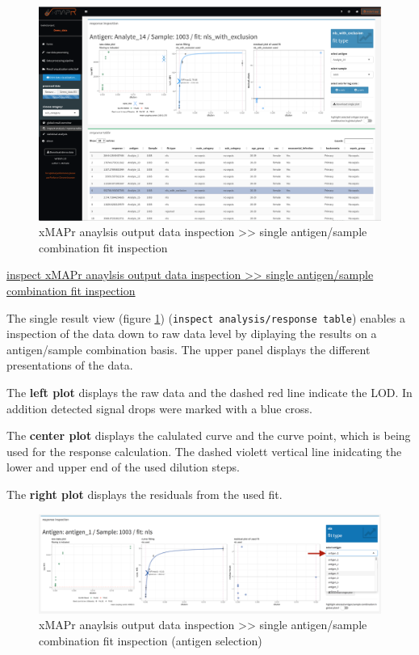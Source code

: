 \documentclass[]{book}
\theoremstyle{definition}
\theoremstyle{definition}
\theoremstyle{definition}
\theoremstyle{remark}
\begin{document}
\begin{figure}
\includegraphics[width=50.5in]{figures/inspect_single_results} \caption{xMAPr anaylsis output data inspection >> single antigen/sample combination fit inspection}\label{fig:SingleResults}
\end{figure}

\href{figures/inspect_single_results.png}{inspect xMAPr anaylsis output
data inspection \textgreater{}\textgreater{} single antigen/sample
combination fit inspection}

The single result view (figure \ref{fig:SingleResults})
(\texttt{inspect\ analysis/response\ table}) enables a inspection of the
data down to raw data level by diplaying the results on a antigen/sample
combination basis. The upper panel displays the different presentations
of the data.

The \textbf{left plot} displays the raw data and the dashed red line
indicate the LOD. In addition detected signal drops were marked with a
blue cross.

The \textbf{center plot} displays the calulated curve and the curve
point, which is being used for the response calculation. The dashed
violett vertical line inidcating the lower and upper end of the used
dilution steps.

The \textbf{right plot} displays the residuals from the used fit.

\begin{figure}
\includegraphics[width=54.53in]{figures/inspect_single_results1} \caption{xMAPr anaylsis output data inspection >> single antigen/sample combination fit inspection (antigen selection)}\label{fig:SingleResults1}
\end{figure}
\end{document}
